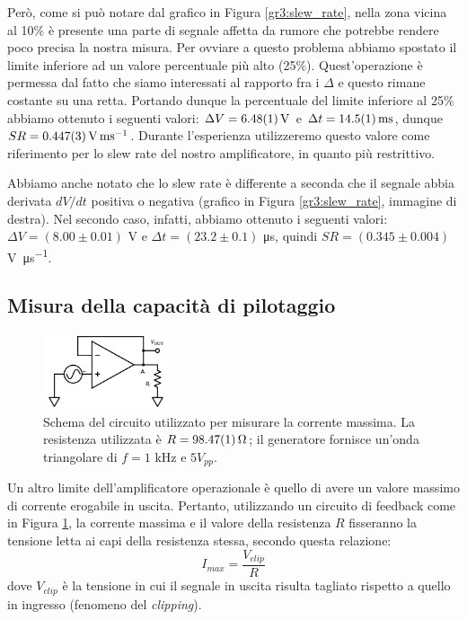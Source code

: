 Però, come si può notare dal grafico in Figura \ref{gr3:slew_rate}, nella zona vicina al 10\% è presente una parte di segnale affetta da rumore che potrebbe rendere poco precisa la nostra misura.
Per ovviare a questo problema abbiamo spostato il limite inferiore ad un valore percentuale più alto (25\%).
Quest'operazione è permessa dal fatto che siamo interessati al rapporto fra i $\Delta$ e questo rimane costante su una retta.
Portando dunque la percentuale del limite inferiore al 25\% abbiamo ottenuto i seguenti valori: $\Delta V = \SI{6.48 \pm 0.01}{\volt}$ e $\Delta t = \SI{14.5 \pm 0.1}{\ms}$, dunque $SR = \SI{0.447 \pm 0.003}{\volt\per\ms}$. Durante l'esperienza utilizzeremo questo valore come riferimento per lo slew rate del nostro amplificatore, in quanto più restrittivo.

Abbiamo anche notato che lo slew rate è differente a seconda che il segnale abbia derivata $dV/dt$ positiva o negativa (grafico in Figura \ref{gr3:slew_rate}, immagine di destra).
Nel secondo caso, infatti, abbiamo ottenuto i seguenti valori: $\Delta V = (8.00 \pm 0.01)$ \si{\volt} e $\Delta t = (23.2 \pm 0.1)$ \si{\micro\second}, quindi $SR = (0.345 \pm 0.004)$ \si{\volt\per\micro\second}.

\subsection{Misura della capacità di pilotaggio}

\begin{figure}
  \begin{center}
    \includegraphics[width=0.33\textwidth]{../E03/latex/max_current.pdf}
  \end{center}
  \caption{Schema del circuito utilizzato per misurare la corrente massima. La resistenza utilizzata è $R=\SI{98.47\pm0.01}{\ohm}$; il generatore fornisce un'onda triangolare di $f=1$ \si{\kilo\hertz} e $5 V_{pp}$.}
  \label{cir3:max_current}
\end{figure}

Un altro limite dell'amplificatore operazionale è quello di avere un valore massimo di corrente erogabile in uscita.
Pertanto, utilizzando un circuito di feedback come in Figura \ref{cir3:max_current}, la corrente massima e il valore della resistenza $R$ fisseranno la tensione letta ai capi della resistenza stessa, secondo questa relazione:
\begin{equation*}
	I_{max} = \frac{V_{clip}}{R}
\end{equation*}
dove $V_{clip}$ è la tensione in cui il segnale in uscita risulta tagliato rispetto a quello in ingresso (fenomeno del \textit{clipping}).

